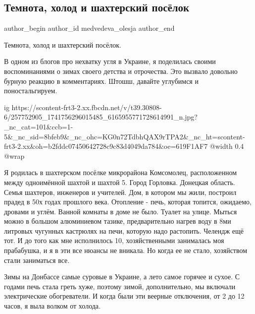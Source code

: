  
 
 
 
 
 
\subsection{Темнота, холод и шахтерский посёлок}
\label{sec:18_11_2021.fb.medvedeva_olesja.1.donbass_detstvo}
 
\ifcmt
 author_begin
   author_id medvedeva_olesja
 author_end
\fi

Темнота, холод и шахтерский посёлок.

В одном из блогов про нехватку угля в Украине, я поделилась своими
воспоминаниями о зимах своего детства и отрочества. Это вызвало довольно бурную
реакцию в комментариях. Штошш, давайте углубимся и поностальгируем. 

\ifcmt
  ig https://scontent-frt3-2.xx.fbcdn.net/v/t39.30808-6/257752905_1741756296015485_6165955771728614991_n.jpg?_nc_cat=101&ccb=1-5&_nc_sid=8bfeb9&_nc_ohc=KG0n72TdbhQAX9rTPA2&_nc_ht=scontent-frt3-2.xx&oh=b2fddc07450642728c9c83d4049da784&oe=619F1AF7
  @width 0.4
  @wrap 
\fi

Я родилась в шахтерском посёлке микрорайона Комсомолец, расположенном между
одноимённой шахтой и шахтой 5. Город Горловка. Донецкая область. Семья
шахтеров, инженеров и учителей. Дом, в котором мы жили, построил прадед в 50х
годах прошлого века. Отопление - печь, которая топится, ожидаемо, дровами и
углём. Ванной комнаты в доме не было. Туалет на улице. Мыться можно в большом
алюминиевом тазике, предварительно нагрев воду в 8ми литровых чугунных
кастрюлях на печи, которую надо растопить. Челендж ещё тот. И до того как мне
исполнилось 10, хозяйственными занималась моя прабабушка, и я в эти все нюансы
не вникала. Но когда ее не стало, хозяйством стали заниматься все. 

Зимы на Донбассе самые суровые в Украине, а лето самое горячее и сухое. С
годами печь стала греть хуже, поэтому зимой, дополнительно, мы включали
электрические обогреватели. И когда были эти веерные отключения, от 2 до 12
часов, я выла волком от холода. 

